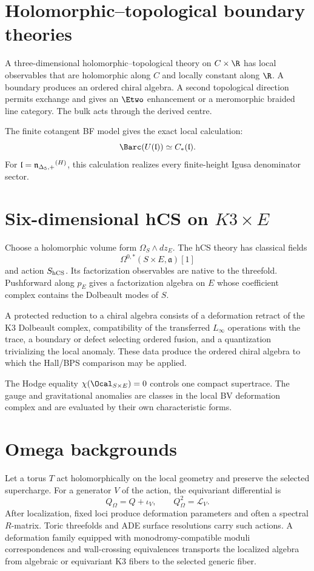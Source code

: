 \chapter{Holomorphic--topological boundary theories}
A three-dimensional holomorphic--topological theory on $C\times\R$ has local observables that are holomorphic along $C$ and locally constant along $\R$. A boundary produces an ordered chiral algebra. A second topological direction permits exchange and gives an $\Etwo$ enhancement or a meromorphic braided line category. The bulk acts through the derived centre.

The finite cotangent BF model gives the exact local calculation:
\[
 \Barc(U(\mathfrak l))\simeq C_*(\mathfrak l).
\]
For $\mathfrak l={\mathfrak n_{\Delta_5,+}}^{(H)}$, this calculation realizes every finite-height Igusa denominator sector.

\chapter{Six-dimensional hCS on \texorpdfstring{$K3\times E$}{K3 x E}}
Choose a holomorphic volume form $\Omega_S\wedge dz_E$. The hCS theory has classical fields
\[
 \Omega^{0,*}(S\times E,\mathfrak a)[1]
\]
and action $S_{\mathrm{hCS}}$. Its factorization observables are native to the threefold. Pushforward along $p_E$ gives a factorization algebra on $E$ whose coefficient complex contains the Dolbeault modes of $S$.

A protected reduction to a chiral algebra consists of a deformation retract of the K3 Dolbeault complex, compatibility of the transferred $L_\infty$ operations with the trace, a boundary or defect selecting ordered fusion, and a quantization trivializing the local anomaly. These data produce the ordered chiral algebra to which the Hall/BPS comparison may be applied.

The Hodge equality $\chi(\Ocal_{S\times E})=0$ controls one compact supertrace. The gauge and gravitational anomalies are classes in the local BV deformation complex and are evaluated by their own characteristic forms.

\chapter{Omega backgrounds}
Let a torus $T$ act holomorphically on the local geometry and preserve the selected supercharge. For a generator $V$ of the action, the equivariant differential is
\[
 Q_\Omega=Q+\iota_V,
 \qquad Q_\Omega^2=\mathcal L_V.
\]
After localization, fixed loci produce deformation parameters and often a spectral $R$-matrix. Toric threefolds and ADE surface resolutions carry such actions. A deformation family equipped with monodromy-compatible moduli correspondences and wall-crossing equivalences transports the localized algebra from algebraic or equivariant K3 fibers to the selected generic fiber.

